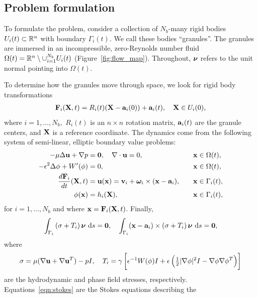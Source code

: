 \subsection{Problem formulation}
To formulate the problem, consider a collection of $N_b$-many rigid
bodies $U_i(t) \subset \RR^n$ with boundary $\Gamma_i(t)$. We call these
bodies ``granules''. The granules are immersed in an incompressible,
zero-Reynolds number fluid $\Omega(t) = \RR^n \setminus \cup_{i=1}^{N_b}
U_i(t)$ (Figure~\ref{fig:flow_map}). Throughout, $\nnu$ refers to
the unit normal pointing into $\Omega(t)$.

To determine how the granules move through space, we look for rigid body
transformations
\begin{align}
\label{eq:RBT}
  \FF_i(\XX,t) = R_i(t)(\XX - \aa_i(0)) + \aa_i(t),\quad \XX \in U_i(0),
\end{align}
where $i = 1,\ldots,N_b,$ $R_i(t)$ is an $n
\times n$ rotation matrix, $\aa_i(t)$ are the granule centers, and $\XX$ is a
reference coordinate.
The dynamics come from the following system of semi-linear, elliptic boundary value problems:
\begin{alignat}{4}
  \label{eqn:stokes} 
  -\mu\Delta \uu + \nabla p &= \mathbf{0}, 
  \quad \nabla \cdot \uu = 0, &&\xx \in \Omega(t), \\
  \label{eqn:phase}
  -\epsilon^2 \Delta \phi + W'(\phi) &= 0, &&\xx \in \Omega(t),\\
  \label{eqn:noslip}        
  \frac{d\FF_i}{dt}(\XX,t) & = \uu(\xx) = 
    \vv_i + \oomega_i \times (\xx - \aa_i), 
  \quad &&\xx \in \Gamma_i(t),\\
  \label{eqn:material}
  \phi(\xx) &= h_i(\XX),  &&\xx \in \Gamma_i(t),
\end{alignat}
for $i=1,\ldots,N_b$ and where $\xx = \FF_i(\XX,t)$. Finally,
\begin{align}
\label{eqn:stressbalance}
\int_{\Gamma_i} \left(\sigma  + T_i\right)\nnu \,\dif s = \mathbf{0},\quad
\int_{\Gamma_i} (\xx - \aa_i)\times \left(\sigma + T_i\right) \nnu
  \,\dif s = \mathbf{0},
\end{align}
where
\begin{align}
\label{eqn:hydro_stress}
\sigma = \mu(\nabla \uu + \nabla \uu^T) - pI,\quad 
T_i = \gamma\left[\epsilon^{-1} W(\phi)I
  + \epsilon\left(\tfrac{1}{2}|\nabla \phi|^2I - \nabla \phi \nabla
  \phi^T\right)\right]
\end{align}
are the hydrodynamic and phase field stresses, respectively.
Equations~\eqref{eqn:stokes} are the Stokes equations describing the
